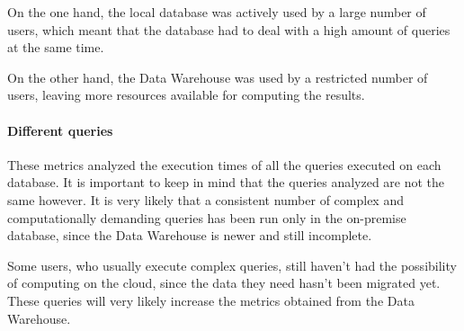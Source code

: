         On the one hand, the local database was actively used by a large number of users, which meant that the database had to deal with a high amount of queries at the same time.
        
        On the other hand, the Data Warehouse was used by a restricted number of users, leaving more resources available for computing the results.
    
    \paragraph{Different queries}
        These metrics analyzed the execution times of all the queries executed on each database.
        It is important to keep in mind that the queries analyzed are not the same however.
        It is very likely that a consistent number of complex and computationally demanding queries has been run only in the on-premise database, since the Data Warehouse is newer and still incomplete.
        
        Some users, who usually execute complex queries, still haven't had the possibility of computing on the cloud, since the data they need hasn't been migrated yet.
        These queries will very likely increase the metrics obtained from the Data Warehouse.
        